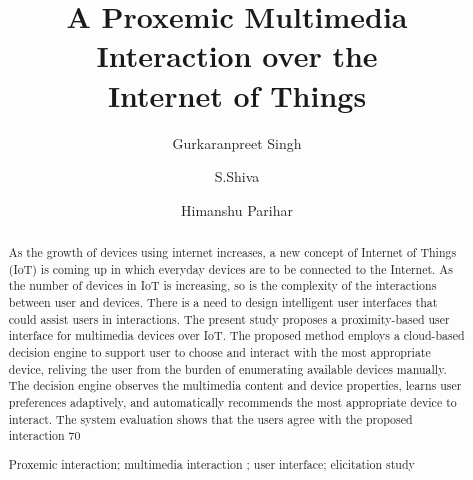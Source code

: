 \documentclass[runningheads,a4paper]{llncs}
\newcommand{\keywords}[1]{\par\addvspace\baselineskip
\noindent\keywordname\enspace\ignorespaces#1}
\begin{document}
\mainmatter  %

\title{A Proxemic Multimedia Interaction over the\\Internet of Things}


%
%
\author{Gurkaranpreet Singh%
\and S.Shiva\and  Himanshu Parihar}%


%
%

\maketitle


\begin{abstract}
As the growth of devices using internet increases, a new concept of Internet of Things (IoT) is coming up in which everyday devices are to be connected to the Internet. As the number of devices in IoT is increasing, so is the complexity of the interactions between user and devices. There is a need to design intelligent user interfaces that could assist users in interactions. The present study proposes a proximity-based user interface for multimedia devices over IoT. The proposed method employs a cloud-based decision engine to support user to choose and interact with the most appropriate device, reliving the user from the burden of enumerating available devices manually. The decision engine observes the multimedia content and device properties, learns user preferences adaptively, and automatically recommends the most appropriate device to interact. The system evaluation shows that the users agree with the proposed interaction 70%
\keywords{Proxemic interaction; multimedia interaction ; user interface; elicitation study}
\end{abstract}
\end{document}
